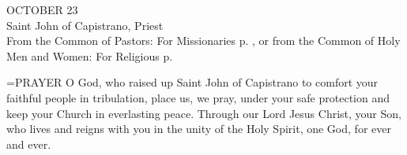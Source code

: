 \begin{center}\normalsize OCTOBER 23\\
\footnotesize Saint John of Capistrano, Priest\\
\footnotesize From the Common of Pastors: For Missionaries p.   , or from the Common of Holy\\
\footnotesize Men and Women: For Religious p.\\
\end{center}

\hangindent=\parindent \small{PRAYER 
O God, who raised up Saint John of Capistrano
to comfort your faithful people in tribulation,
place us, we pray, under your safe protection
and keep your Church in everlasting peace.
Through our Lord Jesus Christ, your Son,
who lives and reigns with you in the unity of the Holy Spirit,
one God, for ever and ever.\\}
 
